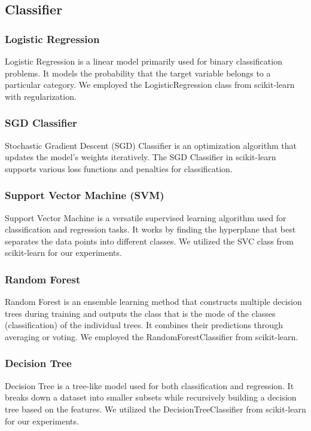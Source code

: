 \documentclass[a4paper, 24pt]{article}
\begin{document}
\subsection{Classifier}
\subsubsection{Logistic Regression}
Logistic Regression is a linear model primarily used for binary classification problems. It models the probability that the target variable belongs to a particular category. We employed the LogisticRegression class from scikit-learn with regularization.

\subsubsection{SGD Classifier}
Stochastic Gradient Descent (SGD) Classifier is an optimization algorithm that updates the model's weights iteratively. The SGD Classifier in scikit-learn supports various loss functions and penalties for classification.

\subsubsection{Support Vector Machine (SVM)}
Support Vector Machine is a versatile supervised learning algorithm used for classification and regression tasks. It works by finding the hyperplane that best separates the data points into different classes. We utilized the SVC class from scikit-learn for our experiments.

\subsubsection{Random Forest}
Random Forest is an ensemble learning method that constructs multiple decision trees during training and outputs the class that is the mode of the classes (classification) of the individual trees. It combines their predictions through averaging or voting. We employed the RandomForestClassifier from scikit-learn.

\subsubsection{Decision Tree}
Decision Tree is a tree-like model used for both classification and regression. It breaks down a dataset into smaller subsets while recursively building a decision tree based on the features. We utilized the DecisionTreeClassifier from scikit-learn for our experiments.
\end{document}
